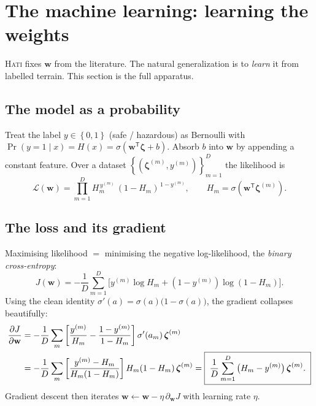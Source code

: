 \documentclass[11pt]{article}
\theoremstyle{definition}
\newcommand{\set}[1]{\left\{ #1 \right\}}
\newcommand{\T}{^{\mathsf{T}}}
\begin{document}
\section{The machine learning: learning the weights}

\textsc{Hati} fixes $\mathbf w$ from the literature. The natural generalization is to
\emph{learn} it from labelled terrain. This section is the full apparatus.

\subsection{The model as a probability}
Treat the label $y\in\set{0,1}$ (safe / hazardous) as Bernoulli with
$\Pr(y=1\mid x)=H(x)=\sigma(\mathbf w\T\boldsymbol\zeta+b)$. Absorb $b$ into
$\mathbf w$ by appending a constant feature. Over a dataset
$\set{(\boldsymbol\zeta^{(m)},y^{(m)})}_{m=1}^{D}$ the likelihood is
\begin{equation}
\mathcal L(\mathbf w)=\prod_{m=1}^{D} H_m^{\,y^{(m)}}\,(1-H_m)^{\,1-y^{(m)}},\qquad H_m=\sigma(\mathbf w\T\boldsymbol\zeta^{(m)}).
\end{equation}

\subsection{The loss and its gradient}
Maximising likelihood $=$ minimising the negative log-likelihood, the
\emph{binary cross-entropy}:
\begin{equation}
J(\mathbf w)=-\frac{1}{D}\sum_{m=1}^{D}\Big[y^{(m)}\log H_m+(1-y^{(m)})\log(1-H_m)\Big].
\label{eq:bce}
\end{equation}
Using the clean identity $\sigma'(a)=\sigma(a)\big(1-\sigma(a)\big)$, the gradient
collapses beautifully:
\begin{align}
\frac{\partial J}{\partial \mathbf w}
&=-\frac1D\sum_m\left[\frac{y^{(m)}}{H_m}-\frac{1-y^{(m)}}{1-H_m}\right]\sigma'(a_m)\,\boldsymbol\zeta^{(m)}\notag\\
&=-\frac1D\sum_m\left[\frac{y^{(m)}-H_m}{H_m(1-H_m)}\right]H_m(1-H_m)\,\boldsymbol\zeta^{(m)}
=\boxed{\;\frac{1}{D}\sum_{m=1}^{D}\big(H_m-y^{(m)}\big)\,\boldsymbol\zeta^{(m)}.\;}
\label{eq:grad}
\end{align}
Gradient descent then iterates $\mathbf w \leftarrow \mathbf w-\eta\,\partial_{\mathbf w}J$
with learning rate $\eta$.
\end{document}
